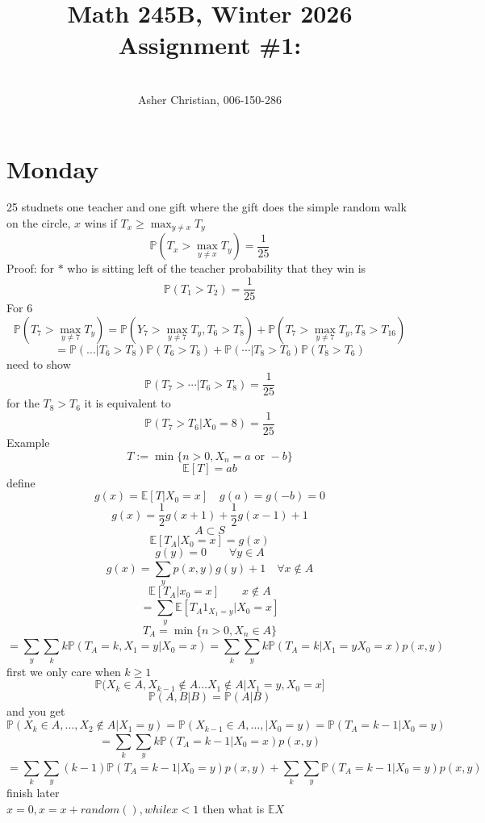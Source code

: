 \documentclass[11pt]{article}
\newcommand{\cnum}{Math 245B}
\newcommand{\ced}{Winter 2026}
\newcommand{\ctitle}[4]{\title{\vspace{-0.5in}\cnum, \ced\\Assignment #1: #2}\author{\vspace{-0.35in}\\#3, #4}}
\begin{document}
\ctitle{\#1}{}{Asher Christian}{006-150-286}
\date{}
\maketitle

\section{Monday}
25 studnets one teacher and one gift where the gift does the simple random walk on the circle,
$x$ wins if $T_x \ge \max_{y \ne x} T_y$
\[
    \mathbb{P}(T_x > \max_{y \ne x}T_y) = \frac{1}{25}
\] 
Proof: for $*$ who is sitting left of the teacher probability that they win is
 \[
\mathbb{P}(T_1 > T_2) = \frac{1}{25}
\] 
For 6
\[
\mathbb{P}(T_7 > \max_{y \ne 7}T_y) = \mathbb{P}(Y_7 > \max_{y \ne 7} T_y, T_6 > T_8) + \mathbb{P}(T_7 > \max_{y \ne 7} T_y, T_8 > T_{16})
\] 
\[
= \mathbb{P}(\dots | T_6 > T_8) \mathbb{P}(T_6 > T_8) + \mathbb{P}(\cdots | T_8 > T_6) \mathbb{P}(T_8 > T_6)
\] 
need to show
\[
\mathbb{P}(T_7 > \cdots | T_6 > T_8) = \frac{1}{25}
\] 
for the $T_8 > T_6$ it is equivalent to
\[
\mathbb{P}(T_7 > T_6 | X_0 = 8) = \frac{1}{25}
\] 
Example
\[
    T:= \min\{n > 0, X_n = a \text{ or } -b\}
\] 
\[
    \mathbb{E}[T] = ab
\] 
define
\[
    g(x) = \mathbb{E}[T | X_0 = x] \quad g(a) = g(-b) = 0
\] 
\[
g(x) = \frac{1}{2}g(x+1) + \frac{1}{2}g(x-1) + 1
\] 
\[
A \subset S
\] 
\[
    \mathbb{E}[T_A | X_0 = x] = g(x)
\] 
\[
g(y) = 0 \qquad \forall y \in A
\] 
\[
g(x) = \sum_{y}^{}p(x,y) g(y)  + 1 \quad \forall x \not\in A
\] 
\[
    \mathbb{E}[T_A | x_0 = x] \qquad x \not\in A
\] 
\[
    = \sum_{y}^{}\mathbb{E}[T_A 1_{X_1 = y}| X_0 = x]
\] 
\[
    T_A = \min \{n > 0, X_n \in A\}
\] 
\[
    = \sum_{y}^{}\sum_{k}^{}k \mathbb{P}(T_A = k, X_1 = y | X_0 = x) = \sum_{k}^{}\sum_{y}^{} k \mathbb{P}(T_A = k | X_1 = y X_0 = x) p(x,y)
\] 
first we only care when $ k \ge 1$
 \[
     \mathbb{P}(X_k \in A, X_{k-1} \not\in A \dots X_1 \not\in A | X_1 = y, X_0 = x]
\] 
\[
\mathbb{P}(A, B | B) = \mathbb{P}(A | B)
\] 
and  you get
\[
    \mathbb{P}(X_k \in A, \dots, X_2 \not\in A | X_1 = y) = \mathbb{P}(X_{k-1} \in A, \dots, | X_0 = y) = \mathbb{P}(T_A = k-1 | X_0 = y)
\] 
\[
= \sum_{k}^{} \sum_{y}^{} k \mathbb{P}(T_A = k-1 | X_0 = x) p(x,y)\]\[ = \sum_{k}^{}\sum_{y}^{}(k-1) \mathbb{P}(T_A = k-1 | X_0 = y) p(x,y) + \sum_{k}^{}\sum_{y}^{} \mathbb{P}(T_A = k-1 | X_0 = y) p(x,y)
\] 
finish later\\
$x = 0, x = x + random(), while x < 1$  then what is $ \mathbb{E}X$
\end{document}

